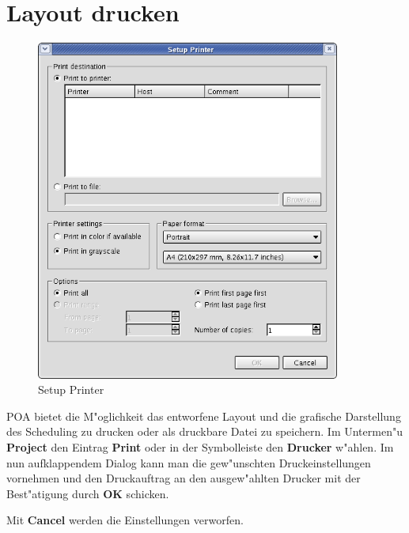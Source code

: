 \documentclass[a4paper,titlepage,12pt,ngerman]{scrbook}
\begin{document}
\section{Layout drucken}
\begin{figure}[htbp]

\begin{center}

\includegraphics[width=10cm]{Printer}

\caption{Setup Printer}\label{test}

\end{center}

\end{figure}
POA bietet die M"oglichkeit das entworfene Layout und die grafische Darstellung des Scheduling zu drucken oder als druckbare Datei zu speichern.
Im Untermen"u {\bf Project} den Eintrag {\bf Print} oder in der Symbolleiste den {\bf Drucker} w"ahlen. Im nun aufklappendem Dialog kann man die gew"unschten Druckeinstellungen vornehmen und den Druckauftrag an den ausgew"ahlten Drucker mit der Best"atigung durch {\bf OK} schicken.\par
Mit {\bf Cancel} werden die Einstellungen verworfen.\par






\newpage
\end{document}
